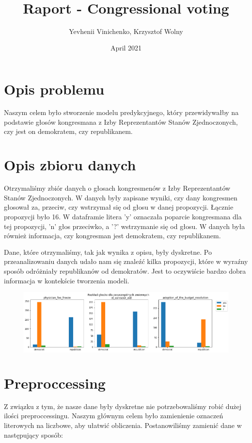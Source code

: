 \documentclass{article}
\title{Raport - Congressional voting}
\author{Yevhenii Vinichenko, Krzysztof Wolny}
\date{April 2021}
\begin{document}
\maketitle

\section{Opis problemu}

Naszym celem było stworzenie modelu predykcyjnego, który przewidywałby na podstawie głosów kongresmana z Izby Reprezentantów Stanów Zjednoczonych, czy jest on demokratem, czy republikanem. 

\section{Opis zbioru danych}

Otrzymaliśmy zbiór danych o głosach kongresmenów z Izby Reprezentantów Stanów Zjednoczonych. W danych były zapisane wyniki, czy dany kongresmen głosował za, przeciw, czy wstrzymał się od głosu w danej propozycji. Łącznie propozycji było 16. W dataframie litera 'y' oznaczała poparcie kongresmana dla tej propozycji, 'n' głos przeciwko, a '?' wstrzymanie się od głosu. W danych była również informacja, czy kongresman jest demokratem, czy republikanem.

Dane, które otrzymaliśmy, tak jak wynika z opisu, były dyskretne. Po przeanalizowaniu danych udało nam się znaleźć kilka propozycji, które w wyraźny sposób odróżniały republikanów od demokratów. Jest to oczywiście bardzo dobra informacja w kontekście tworzenia modeli.

\begin{figure}
\includegraphics[width=15cm]{zdjecia/wykres.png}
\end{figure}

\section{Preproccessing}

Z związku z tym, że nasze dane były dyskretne nie potrzebowaliśmy robić dużej ilości preproccessingu. Naszym głównym celem było zamienienie oznaczeń literowych na liczbowe, aby ułatwić obliczenia. Postanowiliśmy zamienić dane w następujący sposób: 
\end{document}

